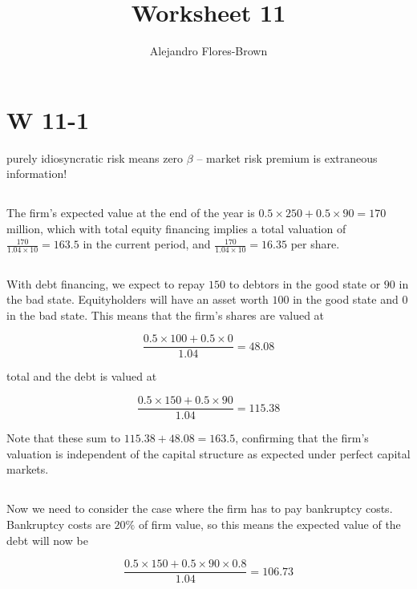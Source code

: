 \documentclass[12pt, letterpaper, parskip = full]{article}
\title{Worksheet 11}
\author{Alejandro Flores-Brown}
\begin{document}
	\maketitle

	\section{W 11-1}

	purely idiosyncratic risk means zero $\beta$ -- market risk premium is extraneous information!

	\subsection{}

	The firm's expected value at the end of the year is \(0.5 \times 250 + 0.5 \times 90 = 170\) million, which with total equity financing implies a total valuation of \(\frac{170}{1.04 \times 10} = 163.5\) in the current period, and \(\frac{170}{1.04 \times 10} = 16.35\) per share.

	\subsection{}

	With debt financing, we expect to repay \(150\) to debtors in the good state or \(90\) in the bad state. Equityholders will have an asset worth \(100\) in the good state and \(0\) in the bad state. This means that the firm's shares are valued at 
	
	\[\frac{0.5 \times 100 + 0.5 \times 0}{1.04} = 48.08 \]

	total and the debt is valued at 

	\[ \frac{0.5 \times 150 + 0.5 \times 90}{1.04} = 115.38 \]

	Note that these sum to \(115.38 + 48.08 = 163.5\), confirming that the firm's valuation is independent of the capital structure as expected under perfect capital markets.

	\subsection{}

	Now we need to consider the case where the firm has to pay bankruptcy costs. Bankruptcy costs are \(20\%\) of firm value, so this means the expected value of the debt will now be

	\[ \frac{0.5 \times 150 + 0.5 \times 90 \times 0.8}{1.04} = 106.73     \]
\end{document}
